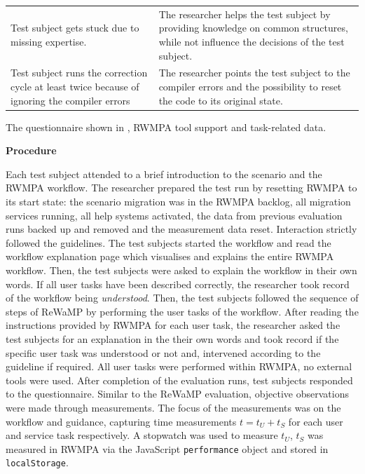 \begin{longtable}[]{@{}ll@{}}
\begin{minipage}[t]{0.47\columnwidth}
Test subject gets stuck due to missing expertise.\strut
\end{minipage} & \begin{minipage}[t]{0.47\columnwidth}\raggedright
The researcher helps the test subject by providing knowledge on common structures, while not influence the decisions of the test subject.\strut
\end{minipage}\tabularnewline
\begin{minipage}[t]{0.47\columnwidth}\raggedright
Test subject runs the correction cycle at least twice because of ignoring the compiler errors\strut
\end{minipage} & \begin{minipage}[t]{0.47\columnwidth}\raggedright
The researcher points the test subject to the compiler errors and the possibility to reset the code to its original state.\strut
\end{minipage}\tabularnewline
\bottomrule
\end{longtable}

The questionnaire shown in , RWMPA tool support and task-related data.


\textbf{Procedure}

Each test subject attended to a brief introduction to the scenario and the RWMPA workflow.
The researcher prepared the test run by resetting RWMPA to its start state: the scenario migration was in the RWMPA backlog, all migration services running, all help systems activated, the data from previous evaluation runs backed up and removed and the measurement data reset.
Interaction strictly followed the guidelines.
The test subjects started the workflow and read the workflow explanation page which visualises and explains the entire RWMPA workflow.
Then, the test subjects were asked to explain the workflow in their own words.
If all user tasks have been described correctly, the researcher took record of the workflow being \emph{understood}.
Then, the test subjects followed the sequence of steps of ReWaMP by performing the user tasks of the workflow.
After reading the instructions provided by RWMPA for each user task, the researcher asked the test subjects for an explanation in the their own words and took record if the specific user task was understood or not and, intervened according to the guideline if required.
All user tasks were performed within RWMPA, no external tools were used.
After completion of the evaluation runs, test subjects responded to the questionnaire.
Similar to the ReWaMP evaluation, objective observations were made through measurements.
The focus of the measurements was on the workflow and guidance, capturing time measurements \(t = t_U + t_S\) for each user and service task respectively.
A stopwatch was used to measure \(t_U\), \(t_S\) was measured in RWMPA via the JavaScript \texttt{performance} object and stored in \texttt{localStorage}.

